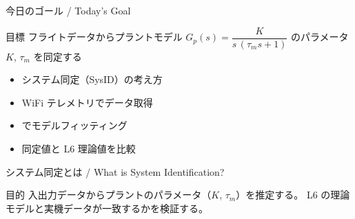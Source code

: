 \documentclass[aspectratio=169, 14pt]{beamer}
\begin{document}
\begin{frame}
  \titlepage
\end{frame}

\begin{frame}{今日のゴール / Today's Goal}
  \begin{block}{目標}
    フライトデータからプラントモデル
    $G_p(s) = \dfrac{K}{s\,(\tau_m s + 1)}$
    のパラメータ $K$, $\tau_m$ を同定する
  \end{block}

  \vspace{1em}

  \begin{itemize}
    \item システム同定（SysID）の考え方
    \item WiFi テレメトリでデータ取得
    \item {} でモデルフィッティング
    \item 同定値と L6 理論値を比較
  \end{itemize}
\end{frame}

\begin{frame}{システム同定とは / What is System Identification?}
  \begin{center}
    \resizebox{0.85\textwidth}{!}{}
  \end{center}

  \vspace{0.5em}

  \begin{block}{目的}
    入出力データからプラントのパラメータ（$K$, $\tau_m$）を推定する。
    L6 の理論モデルと実機データが一致するかを検証する。
  \end{block}
\end{frame}
\end{document}
